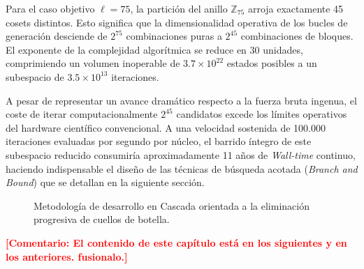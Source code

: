 \documentclass[12pt,a4paper]{tfg_domingo}
\newcommand{\Comentario}[1]{\textcolor{red}{\textbf{[Comentario:
      #1]}}}
\begin{document}
Para el caso objetivo $\ell=75$, la partición del anillo $\mathbb{Z}_{75}$ arroja exactamente 45 cosets distintos. Esto significa que la dimensionalidad operativa de los bucles de generación desciende de $2^{75}$ combinaciones puras a $2^{45}$ combinaciones de bloques. El exponente de la complejidad algorítmica se reduce en 30 unidades, comprimiendo un volumen inoperable de $3.7 \times 10^{22}$ estados posibles a un subespacio de $3.5 \times 10^{13}$ iteraciones.

A pesar de representar un avance dramático respecto a la fuerza bruta ingenua, el coste de iterar computacionalmente $2^{45}$ candidatos excede los límites operativos del hardware científico convencional. A una velocidad sostenida de 100.000 iteraciones evaluadas por segundo por núcleo, el barrido íntegro de este subespacio reducido consumiría aproximadamente 11 años de \emph{Wall-time} continuo, haciendo indispensable el diseño de las técnicas de búsqueda acotada (\emph{Branch and Bound}) que se detallan en la siguiente sección.

\begin{figure}[htb!]
    \centering
    \caption{Metodología de desarrollo en Cascada orientada a la eliminación progresiva de cuellos de botella.}
    \label{fig:waterfall}
\end{figure}
\Comentario{El contenido de este capítulo está en los siguientes y en los anteriores. fusionalo.}
\end{document}
